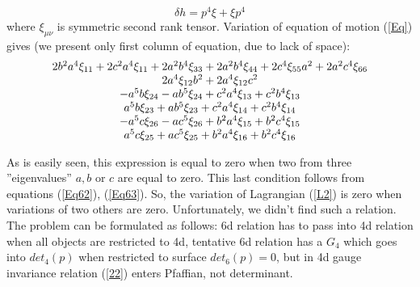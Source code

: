 \documentclass[a4paper,12pt]{article}
\begin{document}
\begin{equation}
\delta h=p^{4}\xi +\xi p^{4}  \label{var61}
\end{equation}
where $\xi_{\mu\nu}$ is symmetric second rank tensor. Variation of
equation of motion (\ref{Eq}) gives (we present only first column
of equation, due to lack of space):
\begin{equation}
\begin{array}{*{20}c}
   2b^{2}a^{4}\xi_{11}+2c^{2}a^{4}\xi_{11}+2a^{2}b^{4}\xi_{33}+2a^{2}b^{4}\xi_{44}+2c^{4}\xi_{55}a^{2}+2a^{2}c^{4}\xi_{66}  \\
    2a^{4}\xi_{12}b^{2}+2a^{4}\xi_{12}c^{2} \\
  -a^{5}b\xi_{24}-ab^{5}\xi_{24}+c^{2}a^{4}\xi_{13}+c^{2}b^{4}\xi_{13}  \\
   a^{5}b\xi_{23}+ab^{5}\xi_{23}+c^{2}a^{4}\xi_{14}+c^{2}b^{4}\xi_{14}  \\
   -a^{5}c\xi_{26}-ac^{5}\xi_{26}+b^{2}a^{4}\xi_{15}+b^{2}c^{4}\xi_{15} \\
   a^{5}c\xi_{25}+ac^{5}\xi_{25}+b^{2}a^{4}\xi_{16}+b^{2}c^{4}\xi_{16}  \\
\end{array}
\end{equation}

As is easily seen, this expression is equal to zero when two from
three ''eigenvalues'' $a, b$ or $c$ are equal to zero. This last
condition follows from  equations  (\ref{Eq62}), (\ref{Eq63}). So,
the variation of Lagrangian (\ref{L2}) is zero when variations of
two others are zero. Unfortunately, we didn't find such a
relation. The problem can be formulated as follows: 6d relation
has to pass into 4d relation when all objects are restricted to
4d, tentative 6d relation has a $ G_{4}$ which goes into
$det_{4}(p)$ when restricted to surface $det_{6}(p)=0$, but in 4d
gauge invariance relation (\ref{22}) enters Pfaffian, not
determinant.
\end{document}
